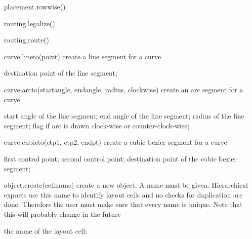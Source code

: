 \begin{APIfunc}{placement.rowwise()}
    
    \begin{APIparameters}
    \end{APIparameters}
\end{APIfunc}
\begin{APIfunc}{routing.legalize()}
    
    \begin{APIparameters}
    \end{APIparameters}
\end{APIfunc}
\begin{APIfunc}{routing.route()}
    
    \begin{APIparameters}
    \end{APIparameters}
\end{APIfunc}
\begin{APIfunc}{curve.lineto(point)}
    create a line segment for a curve
    \begin{APIparameters}
            destination point of the line segment;
    \end{APIparameters}
\end{APIfunc}
\begin{APIfunc}{curve.arcto(startangle, endangle, radius, clockwise)}
    create an arc segment for a curve
    \begin{APIparameters}
            start angle of the line segment;
            end angle of the line segment;
            radius of the line segment;
            flag if arc is drawn clock-wise or counter-clock-wise;
    \end{APIparameters}
\end{APIfunc}
\begin{APIfunc}{curve.cubicto(ctp1, ctp2, endpt)}
    create a cubic bezier segment for a curve
    \begin{APIparameters}
            first control point;
            second control point;
            destination point of the cubic bezier segment;
    \end{APIparameters}
\end{APIfunc}
\begin{APIfunc}{object.create(cellname)}
    create a new object. A name must be given. Hierarchical exports use this name to identify layout cells and no checks for duplication are done. Therefore the user must make sure that every name is unique. Note that this will probably change in the future
    \begin{APIparameters}
            the name of the layout cell;
    \end{APIparameters}
\end{APIfunc}
